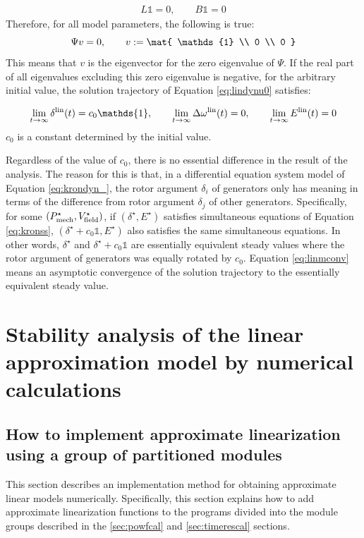 \documentclass[tombow,dvipdfmx]{corona-a5-1.1}
\begin{document}
\begin{align}\label{eq:LBker}
L  \mathds{1} = 0
,\qquad
 B  \mathds{1} =0
\end{align}
Therefore, for all model parameters, the following is true:
\[
\Psi v=0 ,\qquad
v:=\mat{
\mathds{1} \\
0 \\
0
}
\]
This means that $v$ is the eigenvector for the zero eigenvalue of $\Psi$.
If the real part of all eigenvalues excluding this zero eigenvalue is negative, for the arbitrary initial value,
the solution trajectory of Equation \ref{eq:lindynu0} satisfies:

\begin{align}\label{eq:linmconv}
\lim_{t\rightarrow \infty}\delta^{\rm lin}(t)= c_0  \mathds{1},\qquad
\lim_{t\rightarrow \infty}\Delta \omega^{\rm lin}(t)=0 ,\qquad
\lim_{t\rightarrow \infty} E^{\rm lin}(t)=0
\end{align}
$c_0$ is a constant determined by the initial value.

Regardless of the value of $c_0$, there is no essential difference in the result of the analysis.
The reason for this is that, in a differential equation system model of Equation \ref{eq:krondyn_}, the rotor argument $\delta_i$ of generators only has meaning in terms of the difference from rotor argument $\delta_j$ of other generators.
Specifically, for some $(P_{{\rm mech}}^{\star},V_{{\rm field}}^{\star})$, if $(\delta^{\star},E^{\star})$ satisfies simultaneous equations of Equation \ref{eq:kronss}, $(\delta^{\star}+c_0 \mathds{1},E^{\star})$ also satisfies the same simultaneous equations.
In other words, $\delta^{\star}$ and $\delta^{\star}+c_0 \mathds{1}$ are essentially equivalent steady values where the rotor argument of generators was equally rotated by $c_0$.
Equation \ref{eq:linmconv} means an asymptotic convergence of the solution trajectory to the essentially equivalent steady value. 


\section{Stability analysis of the linear approximation model by numerical calculations}\label{sec:numlinsta}

\subsection{How to implement approximate linearization using a group of partitioned modules}
This section describes an implementation method for obtaining approximate linear models numerically.
Specifically, this section explains how to add approximate linearization functions to the programs divided into the module groups described in the \ref{sec:powfcal} and \ref{sec:timerescal} sections.
\end{document}
